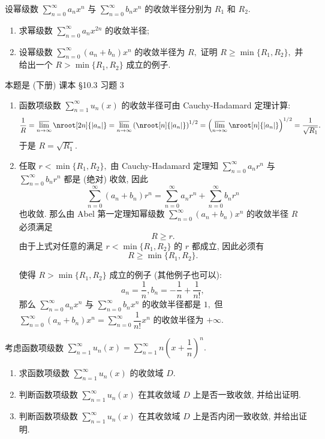 \begin{question}[points = 10]
设幂级数 $\sum\limits_{n=0}^\infty a_n x^n$ 与 $\sum\limits_{n=0}^\infty b_n x^n$ 的收敛半径分别为 $R_1$ 和 $R_2.$
\begin{enumerate}
\item 求幂级数 $\sum\limits_{n=0}^\infty a_n x^{2n}$ 的收敛半径;
\item 设幂级数 $\sum\limits_{n=0}^\infty (a_n + b_n) x^n$ 的收敛半径为 $R,$ 证明 $R \geqslant \min\{R_1, R_2\},$ 并给出一个 $R > \min\{R_1, R_2\}$ 成立的例子.
\end{enumerate}

\end{question}

\begin{solution}
本题是 (下册) 课本 \S 10.3 习题 3

\begin{enumerate}
\item 函数项级数 $\sum\limits_{n=1}^{\infty} u_n(x)$ 的收敛半径可由 Cauchy-Hadamard 定理计算:
\[\dfrac{1}{R} = \varlimsup_{n\to\infty} \nroot[2n]{\lvert a_{n} \rvert} = \varlimsup_{n\to\infty} \left( \nroot[n]{\lvert a_{n} \rvert} \right)^{1/2} = \left( \varlimsup_{n\to\infty} \nroot[n]{\lvert a_{n} \rvert} \right)^{1/2} = \dfrac{1}{\sqrt{R_1}}.\]
于是 $R = \sqrt{R_1}.$
\item 任取 $r < \min\{R_1, R_2\},$ 由 Cauchy-Hadamard 定理知 $\sum\limits_{n=0}^\infty a_n r^n$ 与 $\sum\limits_{n=0}^\infty b_n r^n$ 都是 (绝对) 收敛, 因此
\[\sum\limits_{n=0}^\infty (a_n + b_n) r^n = \sum\limits_{n=0}^\infty a_n r^n + \sum\limits_{n=0}^\infty b_n r^n\]
也收敛. 那么由 Abel 第一定理知幂级数 $\sum\limits_{n=0}^\infty (a_n + b_n) x^n$ 的收敛半径 $R$ 必须满足
\[R \geqslant r.\]
由于上式对任意的满足 $r < \min\{R_1, R_2\}$ 的 $r$ 都成立, 因此必须有 \[R \geqslant \min\{R_1, R_2\}.\]

使得 $R > \min\{R_1, R_2\}$ 成立的例子 (其他例子也可以):
\[a_n = \dfrac{1}{n}, b_n = -\dfrac{1}{n} + \dfrac{1}{n!},\]
那么 $\sum\limits_{n=0}^\infty a_n x^n$ 与 $\sum\limits_{n=0}^\infty b_n x^n$ 的收敛半径都是 $1,$ 但 $\sum\limits_{n=0}^\infty (a_n + b_n) x^n = \sum\limits_{n=0}^\infty \dfrac{1}{n!} x^n$ 的收敛半径为 $+\infty.$
\end{enumerate}
\end{solution}

\begin{question}[points = 10]
考虑函数项级数 $\sum\limits_{n=1}^{\infty} u_n(x) = \sum\limits_{n=1}^{\infty} n \left( x + \dfrac{1}{n} \right)^n.$
\begin{enumerate}
\item 求函数项级数 $\sum\limits_{n=1}^{\infty} u_n(x)$ 的收敛域 $D.$
\item 判断函数项级数 $\sum\limits_{n=1}^{\infty} u_n(x)$ 在其收敛域 $D$ 上是否一致收敛, 并给出证明.
\item 判断函数项级数 $\sum\limits_{n=1}^{\infty} u_n(x)$ 在其收敛域 $D$ 上是否内闭一致收敛, 并给出证明.
\end{enumerate}

\end{question}

